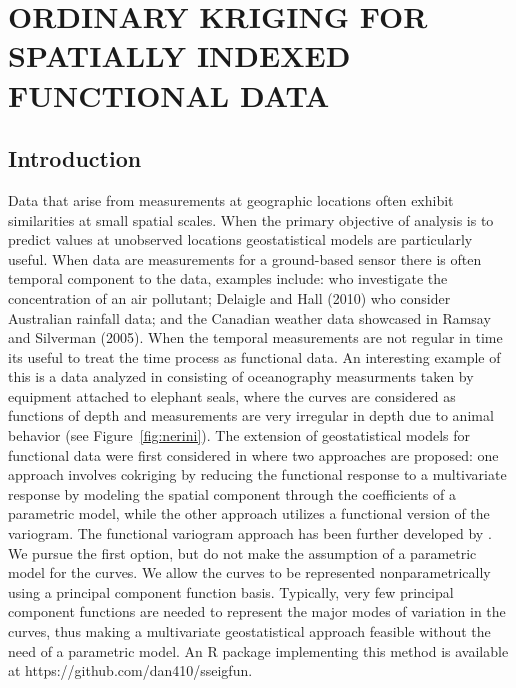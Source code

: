 

\chapter{ORDINARY KRIGING FOR SPATIALLY INDEXED FUNCTIONAL DATA} 
\label{ch:functional kriging}

\section{Introduction} 

\label{sec:introduction}
Data that arise from measurements at geographic locations often exhibit similarities at small spatial scales. When the primary objective of analysis is to predict values at unobserved locations geostatistical models are particularly useful. When data are measurements for a ground-based sensor there is often temporal component to the data, examples include: \cite{Kaiser:2002wna} who investigate the concentration of an air pollutant; Delaigle and Hall (2010) who consider Australian rainfall data; and the Canadian weather data showcased in Ramsay and Silverman (2005). When the temporal measurements are not regular in time its useful to treat the time process as functional data. An interesting example of this is a data analyzed in \cite{Nerini:2010ba} consisting of oceanography measurments taken by equipment attached to elephant seals, where the curves are considered as functions of depth and measurements are very irregular in depth due to animal behavior (see Figure~\ref{fig:nerini}). The extension of geostatistical models for functional data were first considered in \cite{Goulard:1993} where two approaches are proposed: one approach involves cokriging by reducing the functional response to a multivariate response by modeling the spatial component through the coefficients of a parametric model, while the other approach utilizes a functional version of the variogram. The functional variogram approach has been further developed by \cite{Giraldo:2010jx}. We pursue the first option, but do not make the assumption of a parametric model for the curves. We allow the curves to be represented nonparametrically using a principal component function basis. Typically, very few principal component functions are needed to represent the major modes of variation in the curves, thus making a multivariate geostatistical approach feasible without the need of a parametric model. An R package implementing this method is available at https://github.com/dan410/sseigfun.

